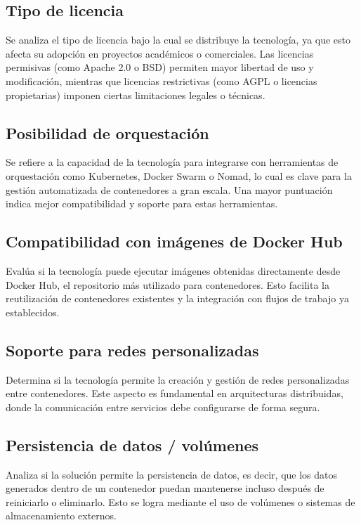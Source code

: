 \subsection{Tipo de licencia}
Se analiza el tipo de licencia bajo la cual se distribuye la tecnología, ya que esto afecta su adopción en proyectos académicos o comerciales. Las licencias permisivas (como Apache 2.0 o BSD) permiten mayor libertad de uso y modificación, mientras que licencias restrictivas (como AGPL o licencias propietarias) imponen ciertas limitaciones legales o técnicas.

\subsection{Posibilidad de orquestación}
Se refiere a la capacidad de la tecnología para integrarse con herramientas de orquestación como Kubernetes, Docker Swarm o Nomad, lo cual es clave para la gestión automatizada de contenedores a gran escala. Una mayor puntuación indica mejor compatibilidad y soporte para estas herramientas.

\subsection{Compatibilidad con imágenes de Docker Hub}
Evalúa si la tecnología puede ejecutar imágenes obtenidas directamente desde Docker Hub, el repositorio más utilizado para contenedores. Esto facilita la reutilización de contenedores existentes y la integración con flujos de trabajo ya establecidos.

\subsection{Soporte para redes personalizadas}
Determina si la tecnología permite la creación y gestión de redes personalizadas entre contenedores. Este aspecto es fundamental en arquitecturas distribuidas, donde la comunicación entre servicios debe configurarse de forma segura.

\subsection{Persistencia de datos / volúmenes}
Analiza si la solución permite la persistencia de datos, es decir, que los datos generados dentro de un contenedor puedan mantenerse incluso después de reiniciarlo o eliminarlo. Esto se logra mediante el uso de volúmenes o sistemas de almacenamiento externos.

